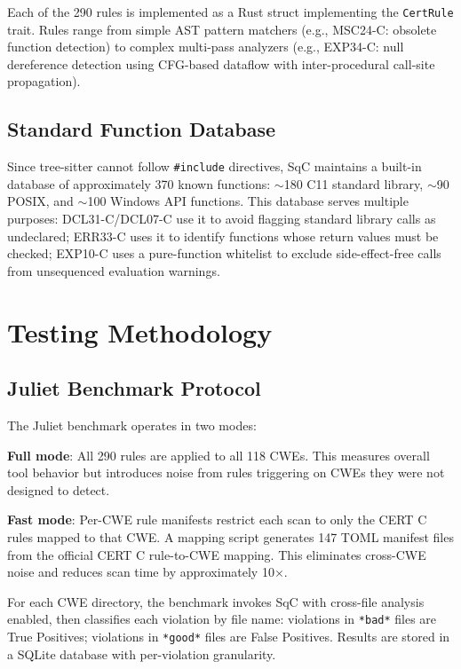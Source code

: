 \documentclass[10pt,twocolumn,letterpaper]{article}
\begin{document}
Each of the 290 rules is implemented as a Rust struct implementing
the \texttt{CertRule} trait.  Rules range from simple AST pattern
matchers (e.g., MSC24-C: obsolete function detection) to complex
multi-pass analyzers (e.g., EXP34-C: null dereference detection
using CFG-based dataflow with inter-procedural call-site propagation).

\subsection{Standard Function Database}
\label{sec:stdlib-db}

Since tree-sitter cannot follow \texttt{\#include} directives, SqC
maintains a built-in database of approximately 370 known functions:
$\sim$180 C11 standard library, $\sim$90 POSIX, and $\sim$100 Windows
API functions.  This database serves multiple purposes: DCL31-C/DCL07-C
use it to avoid flagging standard library calls as undeclared; ERR33-C
uses it to identify functions whose return values must be checked;
EXP10-C uses a pure-function whitelist to exclude side-effect-free
calls from unsequenced evaluation warnings.

\section{Testing Methodology}
\label{sec:methodology}

\subsection{Juliet Benchmark Protocol}

The Juliet benchmark operates in two modes:

\textbf{Full mode}: All 290 rules are applied to all 118 CWEs.  This
measures overall tool behavior but introduces noise from rules
triggering on CWEs they were not designed to detect.

\textbf{Fast mode}: Per-CWE rule manifests restrict each scan to only
the CERT C rules mapped to that CWE.  A mapping script generates 147
TOML manifest files from the official CERT C rule-to-CWE mapping.
This eliminates cross-CWE noise and reduces scan time by approximately
10$\times$.

For each CWE directory, the benchmark invokes SqC with cross-file
analysis enabled, then classifies each violation by file name:
violations in \texttt{*bad*} files are True Positives; violations in
\texttt{*good*} files are False Positives.  Results are stored in a
SQLite database with per-violation granularity.
\end{document}
